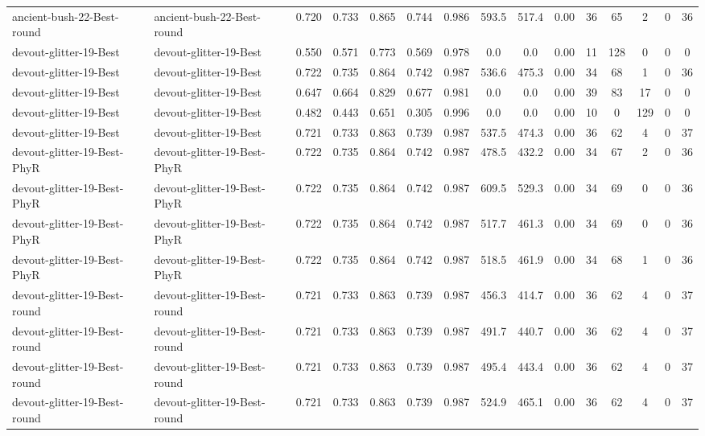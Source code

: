\begin{table*}[p]
{\begin{tabular}{llccccccccccccc}
      ancient-bush-22-Best-round & ancient-bush-22-Best-round & 0.720 & 0.733 & 0.865 & 0.744 & 0.986 & 593.5 & 517.4 & 0.00 & 36 & 65 & 2 & 0 & 36 \\
      devout-glitter-19-Best & devout-glitter-19-Best & 0.550 & 0.571 & 0.773 & 0.569 & 0.978 & 0.0 & 0.0 & 0.00 & 11 & 128 & 0 & 0 & 0 \\
      devout-glitter-19-Best & devout-glitter-19-Best & 0.722 & 0.735 & 0.864 & 0.742 & 0.987 & 536.6 & 475.3 & 0.00 & 34 & 68 & 1 & 0 & 36 \\
      devout-glitter-19-Best & devout-glitter-19-Best & 0.647 & 0.664 & 0.829 & 0.677 & 0.981 & 0.0 & 0.0 & 0.00 & 39 & 83 & 17 & 0 & 0 \\
      devout-glitter-19-Best & devout-glitter-19-Best & 0.482 & 0.443 & 0.651 & 0.305 & 0.996 & 0.0 & 0.0 & 0.00 & 10 & 0 & 129 & 0 & 0 \\
      devout-glitter-19-Best & devout-glitter-19-Best & 0.721 & 0.733 & 0.863 & 0.739 & 0.987 & 537.5 & 474.3 & 0.00 & 36 & 62 & 4 & 0 & 37 \\
      devout-glitter-19-Best-PhyR & devout-glitter-19-Best-PhyR & 0.722 & 0.735 & 0.864 & 0.742 & 0.987 & 478.5 & 432.2 & 0.00 & 34 & 67 & 2 & 0 & 36 \\
      devout-glitter-19-Best-PhyR & devout-glitter-19-Best-PhyR & 0.722 & 0.735 & 0.864 & 0.742 & 0.987 & 609.5 & 529.3 & 0.00 & 34 & 69 & 0 & 0 & 36 \\
      devout-glitter-19-Best-PhyR & devout-glitter-19-Best-PhyR & 0.722 & 0.735 & 0.864 & 0.742 & 0.987 & 517.7 & 461.3 & 0.00 & 34 & 69 & 0 & 0 & 36 \\
      devout-glitter-19-Best-PhyR & devout-glitter-19-Best-PhyR & 0.722 & 0.735 & 0.864 & 0.742 & 0.987 & 518.5 & 461.9 & 0.00 & 34 & 68 & 1 & 0 & 36 \\
      devout-glitter-19-Best-round & devout-glitter-19-Best-round & 0.721 & 0.733 & 0.863 & 0.739 & 0.987 & 456.3 & 414.7 & 0.00 & 36 & 62 & 4 & 0 & 37 \\
      devout-glitter-19-Best-round & devout-glitter-19-Best-round & 0.721 & 0.733 & 0.863 & 0.739 & 0.987 & 491.7 & 440.7 & 0.00 & 36 & 62 & 4 & 0 & 37 \\
      devout-glitter-19-Best-round & devout-glitter-19-Best-round & 0.721 & 0.733 & 0.863 & 0.739 & 0.987 & 495.4 & 443.4 & 0.00 & 36 & 62 & 4 & 0 & 37 \\
      devout-glitter-19-Best-round & devout-glitter-19-Best-round & 0.721 & 0.733 & 0.863 & 0.739 & 0.987 & 524.9 & 465.1 & 0.00 & 36 & 62 & 4 & 0 & 37 \\

\end{tabular}}
\end{table*}
